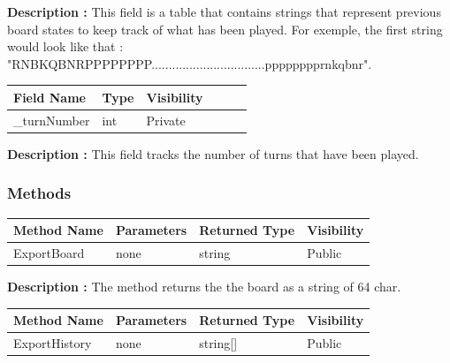 \documentclass[12pt]{article}
\begin{document}
\textbf{Description :} This field is a table that contains strings that
represent previous board states to keep track of what has been played. For exemple,
the first string would look like that :
\\"RNBKQBNRPPPPPPPP.................................pppppppprnkqbnr". 

\begin{table}[H]
    \begin{tabular}{llllll}
    \hline
    \multicolumn{1}{|l|}{\cellcolor[HTML]{EFEFEF}\textbf{Field Name}} & \multicolumn{1}{l|}{\cellcolor[HTML]{EFEFEF}\textbf{Type}} & \multicolumn{1}{l|}{\cellcolor[HTML]{EFEFEF}\textbf{Visibility}} \\ \hline
    \multicolumn{1}{|l|}{\_turnNumber}                                & \multicolumn{1}{l|}{int}                                   & \multicolumn{1}{l|}{Private}                                     \\ \hline
    \end{tabular}
\end{table}

\textbf{Description :} This field tracks the number of turns that have been played.

\subsubsection{Methods}

\begin{table}[H]
    \begin{tabular}{|l|l|l|l|}
    \hline
    \rowcolor[HTML]{EFEFEF} 
    \cellcolor[HTML]{EFEFEF}\textbf{Method Name} & \textbf{Parameters}  & \textbf{Returned Type} & \textbf{Visibility} \\ \hline
    ExportBoard                                  & none                 & string                 & Public              \\ \hline
    \end{tabular}
\end{table}

\textbf{Description :} The method returns the the board as a string of 64 char.

\begin{table}[H]
    \begin{tabular}{|l|l|l|l|}
    \hline
    \rowcolor[HTML]{EFEFEF} 
    \cellcolor[HTML]{EFEFEF}\textbf{Method Name} & \textbf{Parameters}  & \textbf{Returned Type} & \textbf{Visibility} \\ \hline
    ExportHistory                                & none                 & string[]                 & Public            \\ \hline
    \end{tabular}
\end{table}
\end{document}

